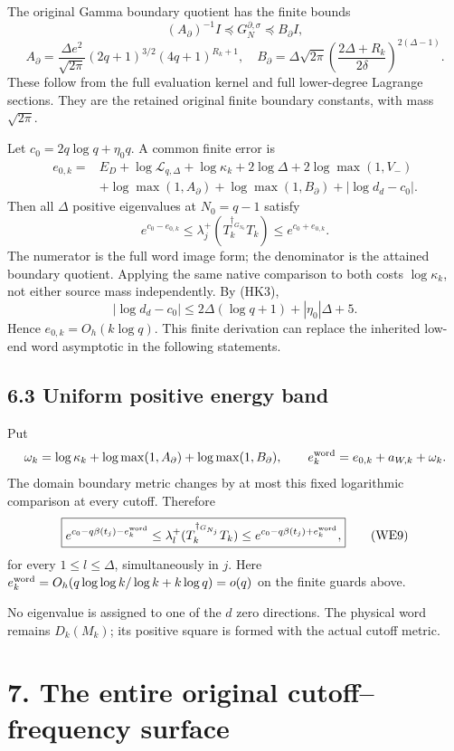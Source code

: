 \documentclass[10pt]{article}
\begin{document}
The original Gamma boundary quotient has the finite bounds \[
 (A_\partial)^{-1}I\preceq G_N^{\partial,\sigma}\preceq B_\partial I,
\] \[
 A_\partial=\frac{\Delta e^2}{\sqrt{2\pi}}(2q+1)^{3/2}
 (4q+1)^{R_k+1},\quad
 B_\partial=\Delta\sqrt{2\pi}
 \left(\frac{2\Delta+R_k}{2\delta}\right)^{2(\Delta-1)}.
 \tag{WE6}
\] These follow from the full evaluation kernel and full lower-degree Lagrange sections. They are the retained original finite boundary constants, with mass \(\sqrt{2\pi}\).

Let \(c_0=2q\log q+\eta_0q\). A common finite error is \[
 \begin{split}
 e_{0,k}={}&E_D+\log\mathcal L_{q,\Delta}+\log\kappa_k
 +2\log\Delta+2\log\max(1,V_-)\\
 &+\log\max(1,A_\partial)+\log\max(1,B_\partial)
 +\left|\log d_d-c_0\right|.
 \end{split}
 \tag{WE7}
\] Then all \(\Delta\) positive eigenvalues at \(N_0=q-1\) satisfy \[
 e^{c_0-e_{0,k}}\le\lambda_j^+(T_k^{\dagger_{G_{N_0}}}T_k)
 \le e^{c_0+e_{0,k}}.
\tag{WE8}
\] The numerator is the full word image form; the denominator is the attained boundary quotient. Applying the same native comparison to both costs \(\log\kappa_k\), not either source mass independently. By (HK3), \[
 |\log d_d-c_0|
 \le2\Delta(\log q+1)+|\eta_0|\Delta+5.
\] Hence \(e_{0,k}=O_h(k\log q)\). This finite derivation can replace the inherited low-end word asymptotic in the following statements.

\subsection{6.3 Uniform positive energy band}\label{uniform-positive-energy-band}

Put \[
 \omega_k=\log\kappa_k+
 \log\max(1,A_\partial)+\log\max(1,B_\partial),\qquad
 e_k^{\rm word}=e_{0,k}+a_{W,k}+\omega_k.
\] The domain boundary metric changes by at most this fixed logarithmic comparison at every cutoff. Therefore \[
 \boxed{e^{c_0-q\beta(t_j)-e_k^{\rm word}}
 \le\lambda_l^+(T_k^{\dagger_{G_{N_j}}}T_k)
 \le e^{c_0-q\beta(t_j)+e_k^{\rm word}},}
 \tag{WE9}
\] for every \(1\le l\le\Delta\), simultaneously in \(j\). Here \(e_k^{\rm word}=O_h(q\log\log k/\log k+k\log q)=o(q)\) on the finite guards above.

No eigenvalue is assigned to one of the \(d\) zero directions. The physical word remains \(D_k(M_k)\); its positive square is formed with the actual cutoff metric.

\section{7. The entire original cutoff--frequency surface}\label{the-entire-original-cutofffrequency-surface}
\end{document}
